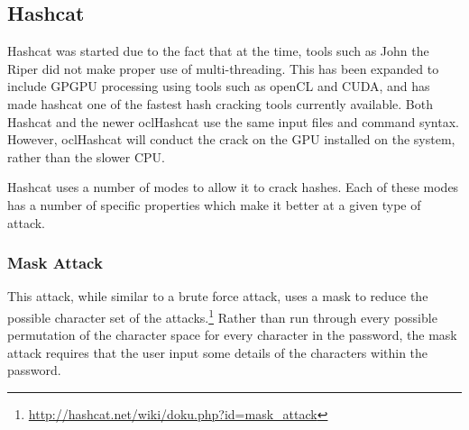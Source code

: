 		\subsection{Hashcat}
			Hashcat was started due to the fact that at the time, tools such as John the Riper did not make proper use of multi-threading. 
			This has been expanded to include GPGPU processing using tools such as openCL and CUDA, and has made hashcat one of the fastest hash cracking tools currently available. 
			Both Hashcat and the newer oclHashcat use the same input files and command syntax. 
			However, oclHashcat will conduct the crack on the GPU installed on the system, rather than the slower CPU. 

			Hashcat uses a number of modes to allow it to crack hashes. 
			Each of these modes has a number of specific properties which make it better at a given type of attack. 

			\subsubsection{Mask Attack}
				This attack, while similar to a brute force attack, uses a mask to reduce the possible character set of the attacks.\footnote{\url{http://hashcat.net/wiki/doku.php?id=mask_attack}} 
				Rather than run through every possible permutation of the character space for every character in the password, the mask attack requires that the user input some details of the characters within the password. 
				
